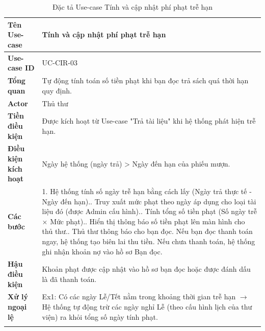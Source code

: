 \begin{longtable}{|p{3.5cm}|p{11.5cm}|}
    \hline
    \textbf{Tên Use-case} & \textbf{Tính và cập nhật phí phạt trễ hạn} \\
    \hline
    \textbf{Use-case ID} & UC-CIR-03 \\
    \hline
    \textbf{Tổng quan} & Tự động tính toán số tiền phạt khi bạn đọc trả sách quá thời hạn quy định. \\
    \hline
    \textbf{Actor} & Thủ thư \\
    \hline
    \textbf{Tiền điều kiện} & Được kích hoạt từ Use-case "Trả tài liệu" khi hệ thống phát hiện trễ hạn. \\
    \hline
    \textbf{Điều kiện kích hoạt} & Ngày hệ thống (ngày trả) > Ngày đến hạn của phiếu mượn. \\
    \hline
    \textbf{Các bước} & 
    1. Hệ thống tính số ngày trễ hạn bằng cách lấy (Ngày trả thực tế - Ngày đến hạn).\newline
    2. Truy xuất mức phạt theo ngày áp dụng cho loại tài liệu đó (được Admin cấu hình).\newline
    3. Tính tổng số tiền phạt (Số ngày trễ $\times$ Mức phạt).\newline
    4. Hiển thị thông báo số tiền phạt lên màn hình cho thủ thư.\newline
    5. Thủ thư thông báo cho bạn đọc. Nếu bạn đọc thanh toán ngay, hệ thống tạo biên lai thu tiền. Nếu chưa thanh toán, hệ thống ghi nhận khoản nợ vào hồ sơ Bạn đọc. \\
    \hline
    \textbf{Hậu điều kiện} & Khoản phạt được cập nhật vào hồ sơ bạn đọc hoặc được đánh dấu là đã thanh toán. \\
    \hline
    \textbf{Xử lý ngoại lệ} & 
    Ex1: Có các ngày Lễ/Tết nằm trong khoảng thời gian trễ hạn $\rightarrow$ Hệ thống tự động trừ các ngày nghỉ Lễ (theo cấu hình lịch của thư viện) ra khỏi tổng số ngày tính phạt. \\
    \hline
    \caption{Đặc tả Use-case Tính và cập nhật phí phạt trễ hạn}
\end{longtable}

